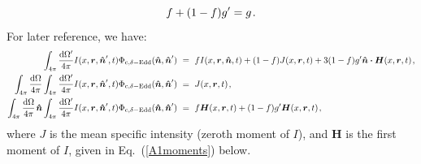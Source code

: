 \documentclass[fleqn,usenatbib]{mnras}
\begin{document}
\begin{equation}
    f+(1-f)g' = g \hspace{1 pt}.
\end{equation}
For later reference, we have:
\begin{align}
    \int_{4\pi} \dfrac{\textrm{d}\Omega'}{4 \pi} I(x, \boldsymbol{r}, \boldsymbol{\hat{n}}', t) \Phi_{\rm c, \delta-Edd} (\boldsymbol{\hat{n}}, \boldsymbol{\hat{n}}')  ~&=~ fI(x, \boldsymbol{r}, \boldsymbol{\hat{n}}, t) + (1-f) J(x, \boldsymbol{r}, t) + 3(1-f)g'  \boldsymbol{\hat{n}} \boldsymbol{\cdot} \boldsymbol{H}(x, \boldsymbol{r}, t) \hspace{1 pt} , \label{zeroth moment of continuum scattering phase function} \\  \int_{4\pi} \dfrac{\textrm{d}\Omega}{4\pi} \int_{4\pi} \dfrac{\textrm{d}\Omega'}{4 \pi} I(x, \boldsymbol{r}, \boldsymbol{\hat{n}}', t) \Phi_{\rm c, \delta-Edd} (\boldsymbol{\hat{n}}, \boldsymbol{\hat{n}}') ~&=~ J(x, \boldsymbol{r}, t) \hspace{1 pt} \label{first moment of continuum scattering phase function}, \\ \int_{4\pi} \dfrac{\textrm{d}\Omega}{4\pi} \hspace{1 pt} \boldsymbol{\hat{n}} \int_{4\pi} \dfrac{\textrm{d}\Omega'}{4 \pi} I(x, \boldsymbol{r}, \boldsymbol{\hat{n}}', t) \Phi_{\rm c, \delta-Edd} (\boldsymbol{\hat{n}}, \boldsymbol{\hat{n}}') ~&=~ f \boldsymbol{H} (x, \boldsymbol{r}, t) + (1-f)g'  \boldsymbol{H} (x, \boldsymbol{r}, t) \hspace{1 pt} \label{second moment of continuum scattering phase function}, 
\end{align}
where $J$ is the mean specific intensity (zeroth moment of $I$), and $\boldsymbol{H}$ is the first moment of $I$, given in Eq.~(\ref{A1moments}) below. 
\end{document}
